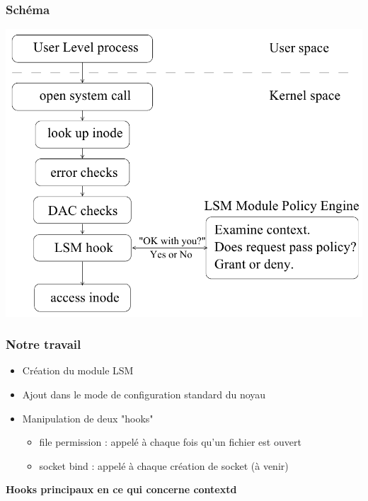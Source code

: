 \documentclass{beamer}
\begin{document}
\begin{frame}
\frametitle{Schéma}
\begin{center}
	\includegraphics[scale=0.30]{attachements/lsm1.png}
\end{center}
\end{frame}

\begin{frame}
\frametitle{Notre travail}
\begin{itemize}
	\item Création du module LSM\\
	\item Ajout dans le mode de configuration standard du noyau\\
	\item Manipulation de deux "hooks"\\
	\begin{itemize}
		\item file permission : appelé à chaque fois qu'un fichier est ouvert
		\item socket bind : appelé à chaque création de socket (à venir)
	\end{itemize}
\end{itemize}
\textbf{Hooks principaux en ce qui concerne contextd}\\
\end{frame}
\end{document}
